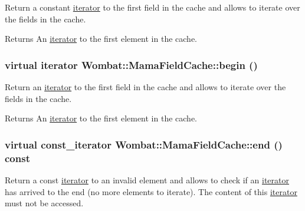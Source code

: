 Return a constant \hyperlink{classWombat_1_1MamaFieldCache_1_1iterator}{iterator} to the first field in the cache and allows to iterate over the fields in the cache. \begin{DoxyReturn}{Returns}
An \hyperlink{classWombat_1_1MamaFieldCache_1_1iterator}{iterator} to the first element in the cache. 
\end{DoxyReturn}
\hypertarget{classWombat_1_1MamaFieldCache_af7558308169df0c0aad30ffa49e5a1d3}{
\subsubsection[{begin}]{\setlength{\rightskip}{0pt plus 5cm}virtual {\bf iterator} Wombat::MamaFieldCache::begin ()}}
\label{classWombat_1_1MamaFieldCache_af7558308169df0c0aad30ffa49e5a1d3}


Return an \hyperlink{classWombat_1_1MamaFieldCache_1_1iterator}{iterator} to the first field in the cache and allows to iterate over the fields in the cache. \begin{DoxyReturn}{Returns}
An \hyperlink{classWombat_1_1MamaFieldCache_1_1iterator}{iterator} to the first element in the cache. 
\end{DoxyReturn}
\hypertarget{classWombat_1_1MamaFieldCache_ac8c46dd5aa1bb2f7142611e9dca17351}{
\subsubsection[{end}]{\setlength{\rightskip}{0pt plus 5cm}virtual {\bf const\_\-iterator} Wombat::MamaFieldCache::end () const}}
\label{classWombat_1_1MamaFieldCache_ac8c46dd5aa1bb2f7142611e9dca17351}


Return a const \hyperlink{classWombat_1_1MamaFieldCache_1_1iterator}{iterator} to an invalid element and allows to check if an \hyperlink{classWombat_1_1MamaFieldCache_1_1iterator}{iterator} has arrived to the end (no more elements to iterate). The content of this \hyperlink{classWombat_1_1MamaFieldCache_1_1iterator}{iterator} must not be accessed.

